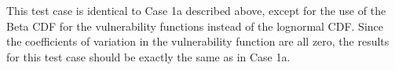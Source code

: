 This test case is identical to Case 1a described above, except for the use of the Beta CDF for the vulnerability functions instead of the lognormal CDF. Since the coefficients of variation in the vulnerability function are all zero, the results for this test case should be exactly the same as in Case 1a.